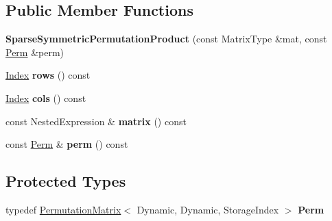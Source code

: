 \subsection*{Public Member Functions}
\begin{DoxyCompactItemize}
\item 
\mbox{\label{class_eigen_1_1_sparse_symmetric_permutation_product_a370dca4285a065f461d876c036b033bb}} 
{\bfseries Sparse\+Symmetric\+Permutation\+Product} (const Matrix\+Type \&mat, const \mbox{\hyperlink{class_eigen_1_1_permutation_matrix}{Perm}} \&perm)
\item 
\mbox{\label{class_eigen_1_1_sparse_symmetric_permutation_product_ae1536b801016aa3c8e30bc8fc2b668ae}} 
\mbox{\hyperlink{struct_eigen_1_1_eigen_base_a554f30542cc2316add4b1ea0a492ff02}{Index}} {\bfseries rows} () const
\item 
\mbox{\label{class_eigen_1_1_sparse_symmetric_permutation_product_aaa3e6f4ec6b0b6e7d5ddd6b90fb315cf}} 
\mbox{\hyperlink{struct_eigen_1_1_eigen_base_a554f30542cc2316add4b1ea0a492ff02}{Index}} {\bfseries cols} () const
\item 
\mbox{\label{class_eigen_1_1_sparse_symmetric_permutation_product_a4e413e198db04775095f311b387fb115}} 
const Nested\+Expression \& {\bfseries matrix} () const
\item 
\mbox{\label{class_eigen_1_1_sparse_symmetric_permutation_product_a3b40313534a1f298e47bf4619891cd5f}} 
const \mbox{\hyperlink{class_eigen_1_1_permutation_matrix}{Perm}} \& {\bfseries perm} () const
\end{DoxyCompactItemize}
\subsection*{Protected Types}
\begin{DoxyCompactItemize}
\item 
\mbox{\label{class_eigen_1_1_sparse_symmetric_permutation_product_a7070c16aa9488b03a2e86a93c8d32117}} 
typedef \mbox{\hyperlink{class_eigen_1_1_permutation_matrix}{Permutation\+Matrix}}$<$ Dynamic, Dynamic, Storage\+Index $>$ {\bfseries Perm}
\end{DoxyCompactItemize}
